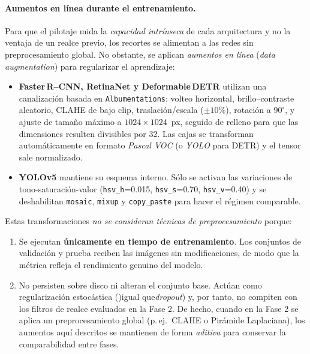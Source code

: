 \paragraph{Aumentos en línea durante el entrenamiento.}
Para que el pilotaje mida la \textit{capacidad intrínseca} de cada arquitectura y no la ventaja de un realce previo, los recortes se alimentan a las redes sin preprocesamiento global.
No obstante, se aplican \emph{aumentos en línea} (\textit{data augmentation}) para regularizar el aprendizaje:

\begin{itemize}
    \item \textbf{Faster\,R--CNN, RetinaNet y Deformable\,DETR} utilizan una canalización basada en \texttt{Albumentations}:
    volteo horizontal, brillo–contraste aleatorio, CLAHE de bajo clip, traslación/escala (\(\pm 10\%\)), rotación a \(90^{\circ}\),
    y ajuste de tamaño máximo a \(1024\times1024\)~px, seguido de relleno para que las dimensiones resulten divisibles por 32.
    Las cajas se transforman automáticamente en formato \textit{Pascal VOC} (o \textit{YOLO} para DETR) y el tensor sale normalizado.
    \item \textbf{YOLOv5} mantiene su esquema interno.
    Sólo se activan las variaciones de tono-saturación-valor (\texttt{hsv\_h}=0.015, \texttt{hsv\_s}=0.70, \texttt{hsv\_v}=0.40) y se deshabilitan \texttt{mosaic}, \texttt{mixup} y \texttt{copy\_paste} para hacer el régimen comparable.
\end{itemize}

Estas transformaciones \emph{no se consideran técnicas de preprocesamiento} porque:

\begin{enumerate}
    \item Se ejecutan \textbf{únicamente en tiempo de entrenamiento}.
    Los conjuntos de validación y prueba reciben las imágenes sin modificaciones, de modo que la métrica refleja el rendimiento genuino del modelo.
    \item No persisten sobre disco ni alteran el conjunto base.
    Actúan como regularización estocástica ()igual que\textit{dropout}) y, por tanto, no compiten con los filtros de realce evaluados en la Fase 2.
    De hecho, cuando en la Fase 2 se aplica un preprocesamiento global (p.\,ej.\ CLAHE o Pirámide Laplaciana), los aumentos aquí descritos se mantienen de forma \textit{aditiva} para conservar la comparabilidad entre fases.
\end{enumerate}

